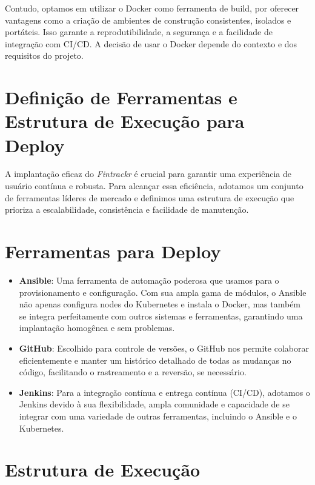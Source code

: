 \par Contudo, optamos em utilizar o Docker como ferramenta de build, por oferecer vantagens como a criação de ambientes de construção consistentes, isolados e portáteis. Isso garante a reprodutibilidade, a segurança e a facilidade de integração com CI/CD. A decisão de usar o Docker depende do contexto e dos requisitos do projeto.

\section{Definição de Ferramentas e Estrutura de Execução para Deploy}

A implantação eficaz do \textit{Fintrackr} é crucial para garantir uma experiência de usuário contínua e robusta. Para alcançar essa eficiência, adotamos um conjunto de ferramentas líderes de mercado e definimos uma estrutura de execução que prioriza a escalabilidade, consistência e facilidade de manutenção.

\section{Ferramentas para Deploy}

\begin{itemize}
	\item \textbf{Ansible}: Uma ferramenta de automação poderosa que usamos para o provisionamento e configuração. Com sua ampla gama de módulos, o Ansible não apenas configura nodes do Kubernetes e instala o Docker, mas também se integra perfeitamente com outros sistemas e ferramentas, garantindo uma implantação homogênea e sem problemas.
	      
	\item \textbf{GitHub}: Escolhido para controle de versões, o GitHub nos permite colaborar eficientemente e manter um histórico detalhado de todas as mudanças no código, facilitando o rastreamento e a reversão, se necessário.
	      
	\item \textbf{Jenkins}: Para a integração contínua e entrega contínua (CI/CD), adotamos o Jenkins devido à sua flexibilidade, ampla comunidade e capacidade de se integrar com uma variedade de outras ferramentas, incluindo o Ansible e o Kubernetes.
\end{itemize}

\section{Estrutura de Execução}

